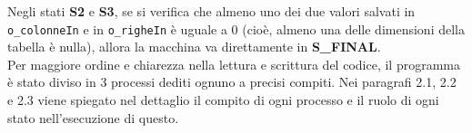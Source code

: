 \documentclass[12pt, table, xcdraw]{article}
\begin{document}
Negli stati \textbf{S2} e \textbf{S3}, se si verifica che almeno uno dei due valori salvati in \texttt{o\_colonneIn} e in \texttt{o\_righeIn} è uguale a 0 (cioè, almeno una delle dimensioni della tabella è nulla), allora la macchina va direttamente in \textbf{ S\_FINAL}.\\
Per maggiore ordine e chiarezza nella lettura e scrittura del codice, il programma è stato diviso in 3 processi dediti ognuno a precisi compiti. Nei paragrafi 2.1, 2.2 e 2.3 viene spiegato nel dettaglio il compito di ogni processo e il ruolo di ogni stato nell'esecuzione di questo.



\newpage
\newenvironment{changemargin}[2]{%
\begin{list}{}{%
\setlength{\topsep}{0 pt}%
\setlength{\leftmargin}{#1}%
\setlength{\rightmargin}{#2}%
\setlength{\listparindent}{\parindent}%
\setlength{\itemindent}{\parindent}%
\setlength{\parsep}{\parskip}%
}%
\item[]}{\end{list}}
\end{document}
